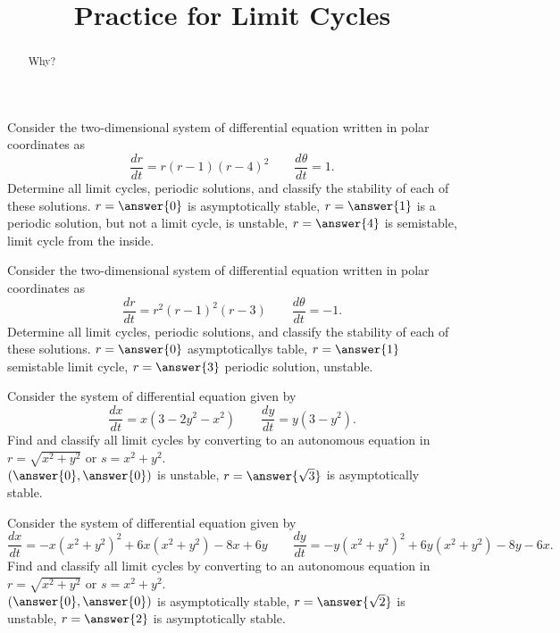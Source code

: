 \documentclass{ximera}
\title{Practice for Limit Cycles}
\begin{document}
\begin{abstract}
Why?
\end{abstract}
\maketitle



\begin{exercise}
    Consider the two-dimensional system of differential equation written in polar coordinates as
    \[ 
        \frac{dr}{dt} = r(r-1)(r-4)^2 \qquad \frac{d\theta}{dt} = 1. 
    \] 
    Determine all limit cycles, periodic solutions, and classify the stability of each of these solutions. 
    $r = \answer{0}$ is asymptotically stable, $r = \answer{1}$ is a periodic solution, but not a limit cycle, is unstable, $r = \answer{4}$ is semistable, limit cycle from the inside.
\end{exercise}

\begin{exercise}
    Consider the two-dimensional system of differential equation written in polar coordinates as
    \[ 
        \frac{dr}{dt} = r^2(r-1)^2(r-3) \qquad \frac{d\theta}{dt} = -1. 
    \] 
    Determine all limit cycles, periodic solutions, and classify the stability of each of these solutions. 
    $r = \answer{0}$ asymptoticallys table, $r = \answer{1}$ semistable limit cycle, $r = \answer{3}$ periodic solution, unstable.
\end{exercise}

\begin{exercise}%
    Consider the system of differential equation given by
    \[ 
        \frac{dx}{dt} = x(3- 2y^2 - x^2) \qquad \frac{dy}{dt} = y(3-y^2) .
    \]
    Find and classify all limit cycles by converting to an autonomous equation in $r = \sqrt{x^2 + y^2}$ or $s = x^2 + y^2$. \\
    $\left(\answer{0},\answer{0}\right)$ is unstable, $r = \answer{\sqrt{3}}$ is asymptotically stable.
\end{exercise}

\begin{exercise}%
    Consider the system of differential equation given by
    \[ 
        \frac{dx}{dt} = -x(x^2 + y^2)^2 + 6x(x^2 + y^2) - 8x + 6y \qquad \frac{dy}{dt} = -y(x^2 + y^2)^2 + 6y(x^2 + y^2) - 8y - 6x .
    \]
    Find and classify all limit cycles by converting to an autonomous equation in $r = \sqrt{x^2 + y^2}$ or $s = x^2 + y^2$. \\
    $\left(\answer{0},\answer{0}\right)$ is asymptotically stable, $r = \answer{\sqrt{2}}$ is unstable, $r = \answer{2}$ is asymptotically stable. 
\end{exercise}
\end{document}
